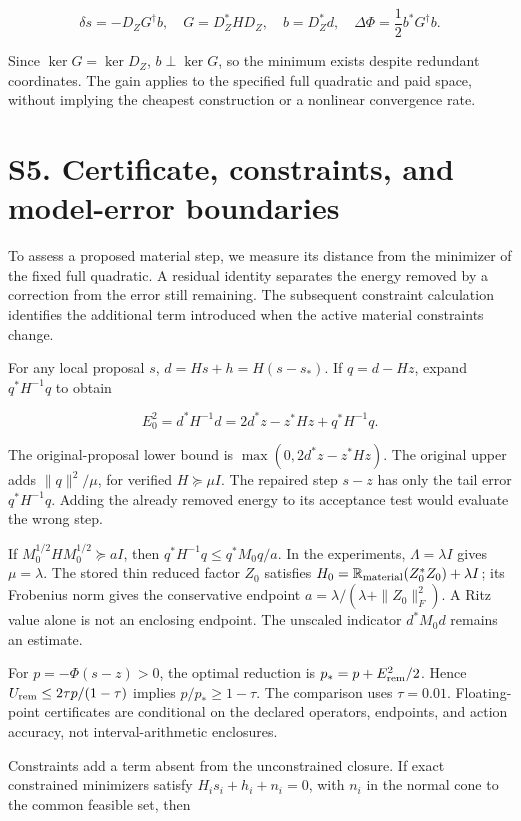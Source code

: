 \documentclass[11pt]{article}
\begin{document}
\[
\delta s=-D_ZG^\dagger b,\quad
G=D_Z^*HD_Z,\quad b=D_Z^*d,\quad
\Delta\Phi=\frac12b^*G^\dagger b. \tag{S11}
\]

Since \(\ker G=\ker D_Z\), \(b\perp\ker G\), so the minimum exists despite redundant coordinates. The gain applies to the specified full quadratic and paid space, without implying the cheapest construction or a nonlinear convergence rate.

\section*{S5. Certificate, constraints, and model-error boundaries}

To assess a proposed material step, we measure its distance from the minimizer of the fixed full quadratic. A residual identity separates the energy removed by a correction from the error still remaining. The subsequent constraint calculation identifies the additional term introduced when the active material constraints change.

For any local proposal \(s\), \(d=Hs+h=H(s-s_*)\). If \(q=d-Hz\), expand \(q^*H^{-1}q\) to obtain

\[
E_0^2=d^*H^{-1}d=2d^*z-z^*Hz+q^*H^{-1}q. \tag{S12}
\]

The original-proposal lower bound is \(\max(0,2d^*z-z^*Hz)\). The original upper adds \(\|q\|^2/\mu\), for verified \(H\succeq\mu I\). The repaired step \(s-z\) has only the tail error \(q^*H^{-1}q\). Adding the already removed energy to its acceptance test would evaluate the wrong step.

If \(M_0^{1/2}HM_0^{1/2}\succeq aI\), then \(q^*H^{-1}q\le q^*M_0q/a\). In the experiments, \(\Lambda=\lambda I\) gives \(\mu=\lambda\). The stored thin reduced factor \(Z_0\) satisfies \(H_0=\mathbb R_{\rm material}(Z_0^*Z_0)+\lambda I\); its Frobenius norm gives the conservative endpoint \(a=\lambda/(\lambda+\|Z_0\|_F^2)\). A Ritz value alone is not an enclosing endpoint. The unscaled indicator \(d^*M_0d\) remains an estimate.

For \(p=-\Phi(s-z)>0\), the optimal reduction is \(p_*=p+E_{\rm rem}^2/2\). Hence \(U_{\rm rem}\le2\tau p/(1-\tau)\) implies \(p/p_*\ge1-\tau\). The comparison uses \(\tau=0.01\). Floating-point certificates are conditional on the declared operators, endpoints, and action accuracy, not interval-arithmetic enclosures.

Constraints add a term absent from the unconstrained closure. If exact constrained minimizers satisfy \(H_is_i+h_i+n_i=0\), with \(n_i\) in the normal cone to the common feasible set, then
\end{document}
